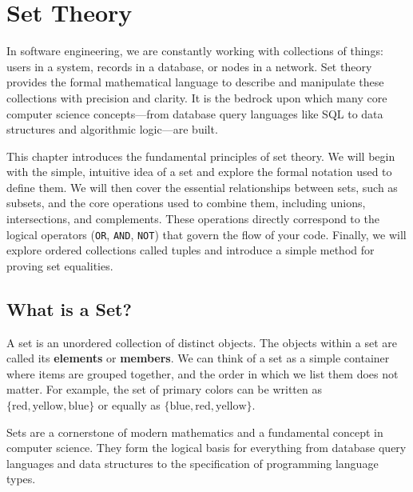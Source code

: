 \chapter{Set Theory}
\label{chap:ch3}

In software engineering, we are constantly working with collections of things: users in a system, records in a database, or nodes in a network. Set theory provides the formal mathematical language to describe and manipulate these collections with precision and clarity. It is the bedrock upon which many core computer science concepts—from database query languages like SQL to data structures and algorithmic logic—are built.

This chapter introduces the fundamental principles of set theory. We will begin with the simple, intuitive idea of a set and explore the formal notation used to define them. We will then cover the essential relationships between sets, such as subsets, and the core operations used to combine them, including unions, intersections, and complements. These operations directly correspond to the logical operators (\texttt{OR}, \texttt{AND}, \texttt{NOT}) that govern the flow of your code. Finally, we will explore ordered collections called tuples and introduce a simple method for proving set equalities.

\section{What is a Set?}
A set is an unordered collection of distinct objects. The objects within a set are called its \textbf{elements} or \textbf{members}. We can think of a set as a simple container where items are grouped together, and the order in which we list them does not matter. For example, the set of primary colors can be written as $\{ \text{red}, \text{yellow}, \text{blue} \}$ or equally as $\{ \text{blue}, \text{red}, \text{yellow} \}$.

Sets are a cornerstone of modern mathematics and a fundamental concept in computer science. They form the logical basis for everything from database query languages and data structures to the specification of programming language types.

